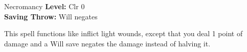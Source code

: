 {Necromancy}
{
	\textbf{Level:}
	Clr 0\\
	\textbf{Saving Throw:}
	Will negates\\
}
{
	This spell functions like inflict light wounds, except that you deal 1 point of damage and a Will save negates the damage instead of halving it.

}
